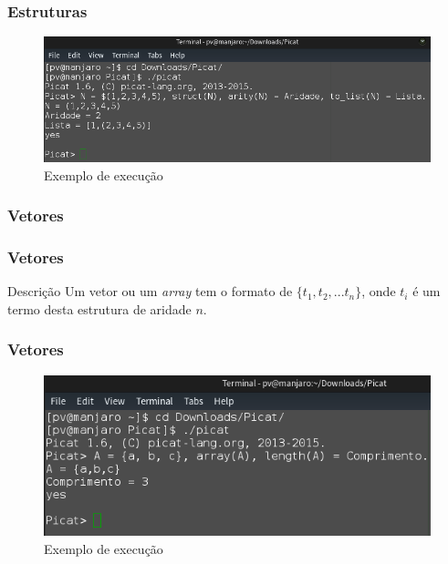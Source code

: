 \documentclass[sans]{beamer}
\begin{document}

\begin{frame}[fragile]   %
\frametitle{Estruturas}

 \begin{figure}[!ht]
 \centering
 \includegraphics[width=.9\textwidth]{picatestrutura.png}
 \caption{Exemplo de execução}
 \end{figure}

\end{frame}


\subsubsection{Vetores}
\begin{frame}[fragile]   %
\frametitle{Vetores}
\begin{block}{Descrição}
  Um vetor ou um \textit{array} tem o formato de $\{t_1, t_2, ... t_n\}$, 
  onde $t_i$ é um termo desta estrutura de aridade  $n$. 
\end{block}
\end{frame}


\begin{frame}[fragile]   %
\frametitle{Vetores}

 \begin{figure}[!ht]
 \centering
 \includegraphics[width=.9\textwidth]{picatvetor.png}
 \caption{Exemplo de execução}
 \end{figure}

\end{frame}
\end{document}
